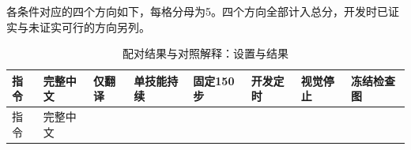 各条件对应的四个方向如下，每格分母为5。四个方向全部计入总分，开发时已证实与未证实可行的方向另列。

\FloatBarrier\begingroup\small\setlength{\tabcolsep}{2.5pt}
\begin{longtable}[]{@{}
  >{\raggedright\arraybackslash}p{}
  >{\raggedright\arraybackslash}p{}
  >{\raggedright\arraybackslash}p{}
  >{\raggedright\arraybackslash}p{}
  >{\raggedright\arraybackslash}p{}
  >{\raggedright\arraybackslash}p{}
  >{\raggedright\arraybackslash}p{}
  >{\raggedright\arraybackslash}p{}@{}}
\caption{配对结果与对照解释：设置与结果}\label{tab:s13-4}\tabularnewline
\toprule\noalign{}
\begin{minipage}[b]{\linewidth}\raggedright
指令
\end{minipage} & \begin{minipage}[b]{\linewidth}\raggedright
完整中文
\end{minipage} & \begin{minipage}[b]{\linewidth}\raggedright
仅翻译
\end{minipage} & \begin{minipage}[b]{\linewidth}\raggedright
单技能持续
\end{minipage} & \begin{minipage}[b]{\linewidth}\raggedright
固定150步
\end{minipage} & \begin{minipage}[b]{\linewidth}\raggedright
开发定时
\end{minipage} & \begin{minipage}[b]{\linewidth}\raggedright
视觉停止
\end{minipage} & \begin{minipage}[b]{\linewidth}\raggedright
冻结检查图
\end{minipage} \\
\midrule\noalign{}
\endfirsthead
\toprule\noalign{}
\begin{minipage}[b]{\linewidth}\raggedright
指令
\end{minipage} & \begin{minipage}[b]{\linewidth}\raggedright
完整中文
\end{minipage} & \begin{minipage}[b]{\linewidth}\raggedright

\end{minipage}
\end{longtable}
